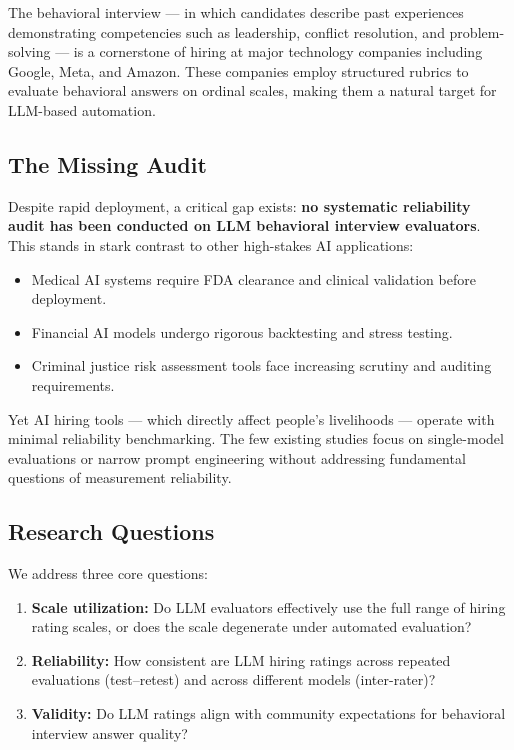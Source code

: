\documentclass{article}
\begin{document}
The behavioral interview --- in which candidates describe past experiences demonstrating competencies such as leadership, conflict resolution, and problem-solving --- is a cornerstone of hiring at major technology companies including Google, Meta, and Amazon. These companies employ structured rubrics to evaluate behavioral answers on ordinal scales, making them a natural target for LLM-based automation.

\subsection{The Missing Audit}
Despite rapid deployment, a critical gap exists: \textbf{no systematic reliability audit has been conducted on LLM behavioral interview evaluators}. This stands in stark contrast to other high-stakes AI applications:
\begin{itemize}
  \item Medical AI systems require FDA clearance and clinical validation before deployment.
  \item Financial AI models undergo rigorous backtesting and stress testing.
  \item Criminal justice risk assessment tools face increasing scrutiny and auditing requirements.
\end{itemize}
Yet AI hiring tools --- which directly affect people's livelihoods --- operate with minimal reliability benchmarking. The few existing studies focus on single-model evaluations or narrow prompt engineering without addressing fundamental questions of measurement reliability.

\subsection{Research Questions}
We address three core questions:
\begin{enumerate}
  \item \textbf{Scale utilization:} Do LLM evaluators effectively use the full range of hiring rating scales, or does the scale degenerate under automated evaluation?
  \item \textbf{Reliability:} How consistent are LLM hiring ratings across repeated evaluations (test--retest) and across different models (inter-rater)?
  \item \textbf{Validity:} Do LLM ratings align with community expectations for behavioral interview answer quality?
\end{enumerate}
\end{document}
